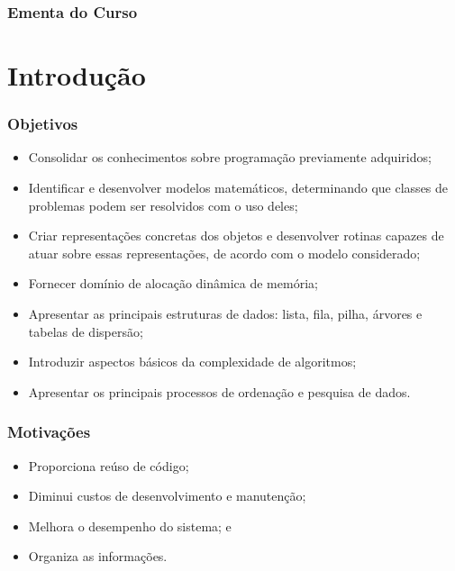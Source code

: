 \documentclass{beamer}
\begin{document}
\begin{frame}
	\frametitle{Ementa do Curso}
  	\tableofcontents
\end{frame}


\section{Introdução}

\begin{frame}
	\frametitle{Objetivos}
	
	\begin{itemize}
		\item Consolidar os conhecimentos sobre programação previamente
		adquiridos;
		\item Identificar e desenvolver modelos matemáticos, determinando que
		classes de problemas podem ser resolvidos com o uso deles;
		\item Criar representações concretas dos objetos e desenvolver rotinas
		capazes de atuar sobre essas representações, de acordo com o modelo
		considerado;
		\item Fornecer domínio de alocação dinâmica de memória;
		\item Apresentar as principais estruturas de dados: lista, fila, pilha, árvores e
		tabelas de dispersão;
		\item Introduzir aspectos básicos da complexidade de algoritmos;
		\item Apresentar os principais processos de ordenação e pesquisa de dados.
	\end{itemize}
\end{frame}

\begin{frame}
	\frametitle{Motivações}
	
	\begin{itemize}
		\item Proporciona reúso de código;
		\item Diminui custos de desenvolvimento e manutenção;
		\item Melhora o desempenho do sistema; e
		\item Organiza as informações.
	\end{itemize}
\end{frame}
\end{document}
